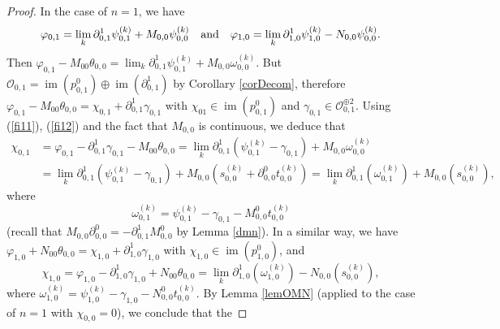 \documentclass[12pt,reqno]{amsart}%
\theoremstyle{plain}
\numberwithin{theorem}{section} \numberwithin{equation}{section}
\numberwithin{lemma}{section}
\numberwithin{remark}{section}
\numberwithin{example}{section}
\numberwithin{proposition}{section}
\numberwithin{definition}{section}
\numberwithin{corollary}{section}
\begin{document}
\begin{proof}
In the case of $n=1$, we have
\begin{equation}
\varphi_{0,1}=\lim_{k}\partial_{0,1}^{1}\psi_{0,1}^{\left(  k\right)
}+M_{0,0}\psi_{0,0}^{\left(  k\right)  }\quad\text{and\quad}\varphi_{1,0}%
=\lim_{k}\partial_{1,0}^{1}\psi_{1,0}^{\left(  k\right)  }-N_{0,0}\psi
_{0,0}^{\left(  k\right)  }. \label{fi11}%
\end{equation}
Then $\varphi_{0,1}-M_{00}\theta_{0,0}=\lim_{k}\partial_{0,1}^{1}\psi
_{0,1}^{\left(  k\right)  }+M_{0,0}\omega_{0,0}^{\left(  k\right)  }$. But
$\mathcal{O}_{0,1}=\operatorname{im}\left(  p_{0,1}^{0}\right)  \oplus
\operatorname{im}\left(  \partial_{0,1}^{1}\right)  $ by Corollary
\ref{corDecom}, therefore $\varphi_{0,1}-M_{00}\theta_{0,0}=\chi
_{0,1}+\partial_{0,1}^{1}\gamma_{0,1}$ with $\chi_{01}\in\operatorname{im}%
\left(  p_{0,1}^{0}\right)  $ and $\gamma_{0,1}\in\mathcal{O}_{0,1}^{\oplus2}%
$. Using (\ref{fi11}), (\ref{fi12}) and the fact that $M_{0,0}$ is continuous,
we deduce that
\begin{align*}
\chi_{0,1}  &  =\varphi_{0,1}-\partial_{0,1}^{1}\gamma_{0,1}-M_{00}%
\theta_{0,0}=\lim_{k}\partial_{0,1}^{1}\left(  \psi_{0,1}^{\left(  k\right)
}-\gamma_{0,1}\right)  +M_{0,0}\omega_{0,0}^{\left(  k\right)  }\\
&  =\lim_{k}\partial_{0,1}^{1}\left(  \psi_{0,1}^{\left(  k\right)  }%
-\gamma_{0,1}\right)  +M_{0,0}\left(  s_{0,0}^{\left(  k\right)  }%
+\partial_{0,0}^{0}t_{0,0}^{\left(  k\right)  }\right)  =\lim_{k}%
\partial_{0,1}^{1}\left(  \omega_{0,1}^{\left(  k\right)  }\right)
+M_{0,0}\left(  s_{0,0}^{\left(  k\right)  }\right)  ,
\end{align*}
where
\begin{equation}
\omega_{0,1}^{\left(  k\right)  }=\psi_{0,1}^{\left(  k\right)  }-\gamma
_{0,1}-M_{0,0}^{0}t_{0,0}^{\left(  k\right)  } \label{fi13}%
\end{equation}
(recall that $M_{0,0}\partial_{0,0}^{0}=-\partial_{0,1}^{1}M_{0,0}^{0}$ by
Lemma \ref{dmn}). In a similar way, we have $\varphi_{1,0}+N_{00}\theta
_{0,0}=\chi_{1,0}+\partial_{1,0}^{1}\gamma_{1,0}$ with $\chi_{1,0}%
\in\operatorname{im}\left(  p_{1,0}^{0}\right)  $, and
\[
\chi_{1,0}=\varphi_{1,0}-\partial_{1,0}^{1}\gamma_{1,0}+N_{00}\theta
_{0,0}=\lim_{k}\partial_{1,0}^{1}\left(  \omega_{1,0}^{\left(  k\right)
}\right)  -N_{0,0}\left(  s_{0,0}^{\left(  k\right)  }\right)  ,
\]
where $\omega_{1,0}^{\left(  k\right)  }=\psi_{1,0}^{\left(  k\right)
}-\gamma_{1,0}-N_{0,0}^{0}t_{0,0}^{\left(  k\right)  }$. By Lemma \ref{lemOMN}
(applied to the case of $n=1$ with $\chi_{0,0}=0$), we conclude that the

\end{proof}
\end{document}
